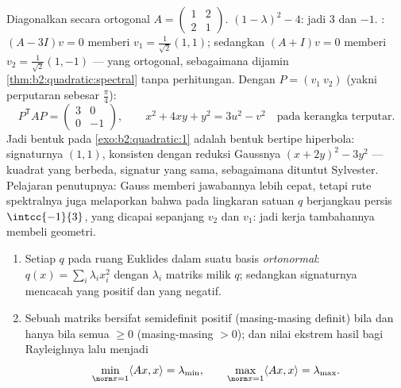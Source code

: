 \begin{example}\label{ex:b2:quadratic:fullrun}
Diagonalkan secara ortogonal $A = \begin{pmatrix} 1 & 2\\ 2 &
1\end{pmatrix}$.  $(1 - \lambda)^2 -
4$: jadi  $3$ dan $-1$. : $(A - 3I)v = 0$
memberi $v_1 = \frac{1}{\sqrt2}(1,1)$; sedangkan $(A + I)v = 0$ memberi $v_2
= \frac{1}{\sqrt2}(1,-1)$ --- yang ortogonal, sebagaimana dijamin
\cref{thm:b2:quadratic:spectral} tanpa
perhitungan. Dengan $P = (v_1\ v_2)$ (yakni perputaran sebesar
$\frac\pi4$):
\[
P^{\mathsf T}AP = \begin{pmatrix} 3 & 0\\ 0 & -1
\end{pmatrix},
\qquad
x^2 + 4xy + y^2 = 3u^2 - v^2
\quad\text{pada kerangka terputar} .
\]
Jadi bentuk pada \cref{exo:b2:quadratic:1} adalah bentuk bertipe
hiperbola: signaturnya $(1,1)$, konsisten dengan reduksi Gaussnya
$(x + 2y)^2 - 3y^2$ --- kuadrat yang berbeda, signatur yang sama,
sebagaimana dituntut Sylvester. Pelajaran penutupnya: Gauss memberi jawabannya
lebih cepat, tetapi rute spektralnya juga melaporkan bahwa pada lingkaran
satuan $q$ berjangkau persis $\intcc{-1}{3}$, yang dicapai sepanjang
$v_2$ dan $v_1$: jadi kerja tambahannya membeli geometri.
\end{example}

\begin{corollary}\label{cor:b2:quadratic:principalaxes}
\begin{enumerate}
  \item Setiap  $q$ pada ruang Euklides  dalam suatu basis \emph{ortonormal}: $q(x) =
        \sum_i \lambda_i x_i^2$ dengan $\lambda_i$  matriks
         milik $q$; sedangkan signaturnya mencacah 
        yang positif dan yang negatif.
  \item Sebuah matriks  bersifat semidefinit positif (masing-masing
        definit) bila dan hanya bila semua  $\geq 0$
        (masing-masing $> 0$); dan nilai ekstrem hasil bagi Rayleighnya
        lalu menjadi
        \[
        \min_{\norm x = 1} \langle Ax, x\rangle = \lambda_{\min},
        \qquad
        \max_{\norm x = 1} \langle Ax, x\rangle = \lambda_{\max} .
        \]
\end{enumerate}
\end{corollary}

